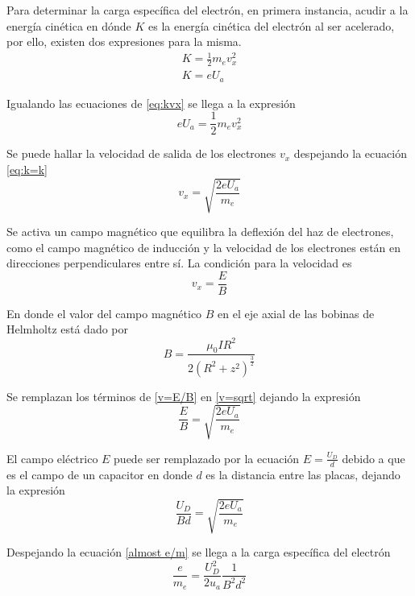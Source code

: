 Para determinar la carga específica del electrón, en primera instancia,
acudir a la energía cinética  en dónde $K$ es la energía cinética del electrón
al ser acelerado, por ello, existen dos expresiones para la misma.
\begin{equation}\label{eq:kvx}
  \begin{split}
    K=\frac{1}{2}m_ev_x^2\\
    K=eU_a
  \end{split}
\end{equation}

Igualando las ecuaciones de \ref{eq:kvx} se llega a la expresión
\begin{equation}\label{eq:k=k}
  eU_a=\frac{1}{2}m_ev_x^2
\end{equation}

Se puede hallar la velocidad de salida de los electrones $v_x$ despejando la
ecuación \ref{eq:k=k}
\begin{equation}\label{v=sqrt}
  v_x=\sqrt{\frac{2eU_a}{m_e}}
\end{equation}

Se activa un campo magnético que equilibra la deflexión del haz de electrones,
como el campo magnético de inducción  y la velocidad de los electrones están en
direcciones perpendiculares entre sí.
La condición para la velocidad es
\begin{equation}\label{v=E/B}
  v_x=\frac{E}{B}
\end{equation}

En donde el valor del campo magnético $B$ en el eje axial  de las bobinas de
Helmholtz está dado por \cite{papadopoulos-1963}
\begin{equation}
  B=\frac{\mu_0IR^2}{2(R^2+z^2)^{\frac{3}{2}}}
\end{equation}

Se remplazan los términos de \ref{v=E/B} en \ref{v=sqrt} dejando la expresión
\begin{equation}
  \frac{E}{B}=\sqrt{\frac{2eU_a}{m_e}}
\end{equation}

El campo eléctrico $E$ puede ser remplazado por la ecuación $E=\frac{U_D}{d}$
debido a que es el campo de un capacitor en donde $d$ es la distancia entre las
placas, dejando la expresión
\begin{equation}\label{almost e/m}
  \frac{U_D}{Bd}=\sqrt{\frac{2eU_a}{m_e}}
\end{equation}

Despejando la ecuación \ref{almost e/m} se llega a la carga específica del
electrón
\begin{equation}
  \frac{e}{m_e}=\frac{U_D^2}{2u_a}\frac{1}{B^2d^2}
\end{equation}
